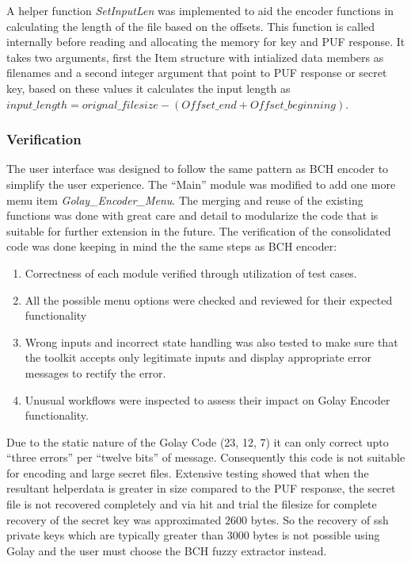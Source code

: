 	A helper function \emph{SetInputLen} was implemented to aid the encoder functions in calculating the length of the file based on the offsets. This function is called internally before reading and allocating the memory for key and PUF response. It takes two arguments, first the Item structure with intialized data members as filenames and a second integer argument that point to PUF response or secret key, based on these values it calculates the input length as $input\_length =
	orignal\_filesize - (Offset\_end + Offset\_beginning)$. \\

	\subsubsection{Verification}
	The user interface was designed to follow the same pattern as BCH encoder to simplify the user experience. The ``Main'' module was modified to add one more menu item \emph{Golay\_Encoder\_Menu}. The merging and reuse of the existing functions was done with great care and detail to modularize the code that is suitable for further extension in the future. The verification of the consolidated code was done keeping in mind the the same steps as BCH encoder:
	\begin{enumerate}
		\item Correctness of each module verified through utilization of test cases.
		\item All the possible menu options were checked and reviewed for their expected functionality
		\item Wrong inputs and incorrect state handling was also tested to make sure that the toolkit accepts only legitimate inputs and display appropriate error messages to rectify the error.
		\item Unusual workflows were inspected to assess their impact on Golay Encoder functionality.
	\end{enumerate}

	Due to the static nature of the Golay Code (23, 12, 7) it can only correct upto ``three errors'' per ``twelve bits'' of message. Consequently this code is not suitable for encoding and large secret files. Extensive testing showed that when the resultant helperdata is greater in size compared to the PUF response, the secret file is not recovered completely and via hit and trial the filesize for complete recovery of the secret key was approximated $2600$ bytes. So the recovery of ssh private keys which are
	typically greater than 3000 bytes is not possible using Golay and the user must choose the BCH fuzzy extractor instead.

